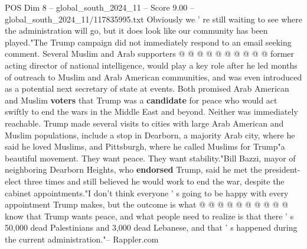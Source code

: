\begin{textsample}{POS Dim 8 – global\_south\_2024\_11 – Score 9.00 – global\_south\_2024\_11/117835995.txt}
Obviously we ' re still waiting to see where the administration will go, but it does look like our community has been played."The Trump campaign did not immediately respond to an email seeking comment.
Several Muslim and Arab supporters @ @ @ @ @ @ @ @ @ @ former acting director of national intelligence, would play a key role after he led months of outreach to Muslim and Arab American communities, and was even introduced as a potential next secretary of state at events.
Both promised Arab American and Muslim \textbf{voters} that Trump was a \textbf{candidate} for peace who would act swiftly to end the wars in the Middle East and beyond.
Neither was immediately reachable.
Trump made several visits to cities with large Arab American and Muslim populations, include a stop in Dearborn, a majority Arab city, where he said he loved Muslims, and Pittsburgh, where he called Muslims for Trump"a beautiful movement.
They want peace.
They want stability."Bill Bazzi, mayor of neighboring Dearborn Heights, who \textbf{endorsed} Trump, said he met the president-elect three times and still believed he would work to end the war, despite the cabinet appointments."I don't think everyone ' s going to be happy with every appointment Trump makes, but the outcome is what @ @ @ @ @ @ @ @ @ @ know that Trump wants peace, and what people need to realize is that there ' s 50,000 dead Palestinians and 3,000 dead Lebanese, and that ' s happened during the current administration."-- Rappler.com

\end{textsample}
